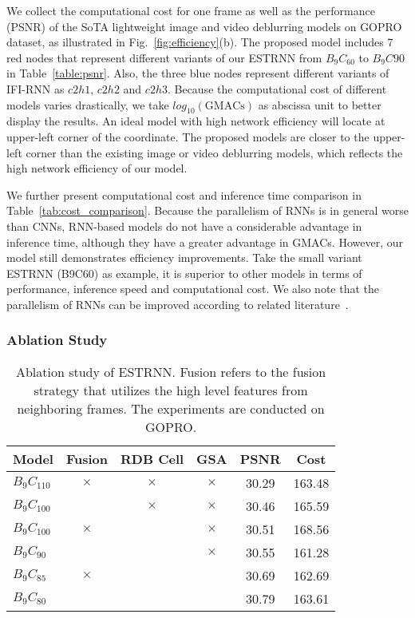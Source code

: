 \documentclass[twocolumn]{svjour3}          \smartqed  \usepackage{graphicx}
\begin{document}
We collect the computational cost for one frame as well as the performance (PSNR) of the SoTA lightweight image and video deblurring models on GOPRO dataset, as illustrated in Fig.~\ref{fig:efficiency}(b). The proposed model includes 7 red nodes that represent different variants of our ESTRNN from $B_9C_{60}$ to $B_9C{90}$ in Table~\ref{table:psnr}. Also, the three blue nodes represent different variants of IFI-RNN as $c2h1$, $c2h2$ and $c2h3$. Because the computational cost of different models varies drastically, we take $log_{10}(\text{GMACs})$ as abscissa unit to better display the results. An ideal model with high network efficiency will locate at upper-left corner of the coordinate. The proposed models are closer to the upper-left corner than the existing image or video deblurring models, which reflects the high network efficiency of our model.

We further present computational cost and inference time comparison in Table~\ref{tab:cost_comparison}. Because the parallelism of RNNs is in general worse than CNNs, RNN-based models do not have a considerable advantage in inference time, although they have a greater advantage in GMACs. However, our model still demonstrates efficiency improvements. Take the small variant ESTRNN (B9C60) as example, it is superior to other models in terms of performance, inference speed and computational cost. We also note that the parallelism of RNNs can be improved according to related literature~\cite{lei2017simple,yu2018sliced}.

\subsubsection{Ablation Study}

\begin{table}[!ht]
	\caption{Ablation study of ESTRNN. Fusion refers to the fusion strategy that utilizes the high level features from neighboring frames. The experiments are conducted on GOPRO.}
	\label{table:ablation}
	\centering
	\begin{tabular}{lccccc}
		\toprule
		Model & Fusion & RDB Cell & GSA & PSNR & Cost\\
		\midrule
		$B_9C_{110}$ & $\times$ & $\times$ & $\times$ & 30.29 & 163.48 \\
		$B_9C_{100}$ & \checkmark & $\times$ & $\times$ & 30.46 & 165.59 \\
		$B_9C_{100}$ & $\times$ & \checkmark & $\times$ & 30.51 & 168.56 \\
		$B_9C_{90}$ & \checkmark & \checkmark & $\times$ & 30.55 & 161.28 \\
		$B_9C_{85}$ & $\times$ & \checkmark & \checkmark & 30.69 & 162.69 \\
		$B_9C_{80}$ & \checkmark & \checkmark & \checkmark & 30.79 & 163.61 \\
		\bottomrule
	\end{tabular}
\end{table}
\end{document}
